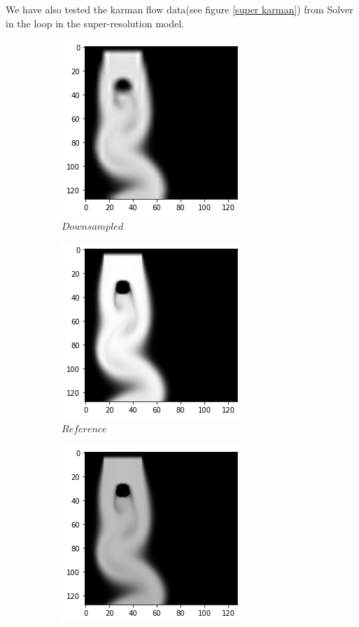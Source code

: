 \documentclass[a4paper,12pt,twoside]{report}
\begin{document}
We have also tested the karman flow data(see figure \ref{super karman}) from Solver in the loop in the super-resolution model. 
\begin{figure}
	\centering
	\begin{subfigure}{0.32\textwidth}
		\centering
		\includegraphics[scale=0.5]{superresolution/karman_down.png}
		\caption{$Downsampled$}
	\end{subfigure}
	\begin{subfigure}{0.32\textwidth}
		\centering
		\includegraphics[scale=0.5]{superresolution/karman_ref.png}
		\caption{$Reference$}
	\end{subfigure}
	\begin{subfigure}{0.32\textwidth}
		\centering
		\includegraphics[scale=0.5]{superresolution/karman_mse.png}

\end{subfigure}
\end{figure}
\end{document}
